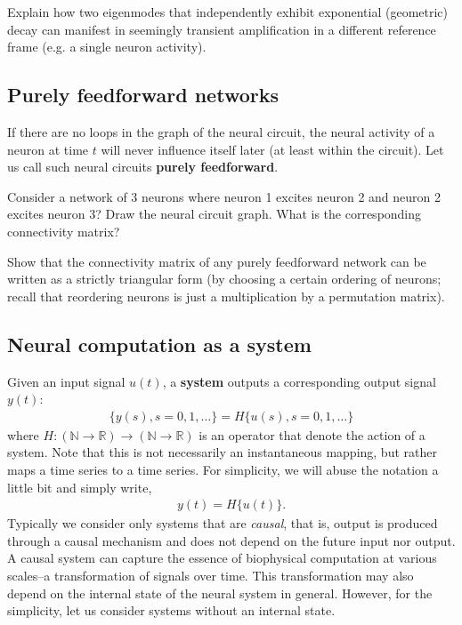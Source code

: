 \documentclass[a4paper,11pt]{exam}
\newcounter{ct}
\newcommand{\field}[1]{\ensuremath{\mathbb{#1}}}
\newcommand{\reals}{\field{R}}
\newcommand{\naturalNumbers}{\field{N}}
\begin{document}
\begin{questions}
\question Explain how two eigenmodes that independently exhibit exponential (geometric) decay can manifest in seemingly transient amplification in a different reference frame (e.g. a single neuron activity).

\subsection{Purely feedforward networks}
If there are no loops in the graph of the neural circuit, the neural activity of a neuron at time $t$ will never influence itself later (at least within the circuit).
Let us call such neural circuits \textbf{purely feedforward}.

\question Consider a network of 3 neurons where neuron 1 excites neuron 2 and neuron 2 excites neuron 3? Draw the neural circuit graph.
What is the corresponding connectivity matrix?

\question Show that the connectivity matrix of any purely feedforward network can be written as a strictly triangular form (by choosing a certain ordering of neurons; recall that reordering neurons is just a multiplication by a permutation matrix).


\subsection{Neural computation as a system}
Given an input signal $u(t)$, a \textbf{system} outputs a corresponding output signal $y(t)$:
\begin{align}
    \{y(s), s = 0, 1, \ldots\} = H\{u(s), s = 0, 1, \ldots\}
\end{align}
where $H: (\naturalNumbers \to \reals) \to (\naturalNumbers \to \reals)$ is an operator that denote the action of a system.
Note that this is not necessarily an instantaneous mapping, but rather maps a time series to a time series.
For simplicity, we will abuse the notation a little bit and simply write,
\begin{align}
    y(t) = H\{u(t)\}.
\end{align}
Typically we consider only systems that are \emph{causal}, that is, output is produced through a causal mechanism and does not depend on the future input nor output.
A causal system can capture the essence of biophysical computation at various scales--a transformation of signals over time.
This transformation may also depend on the internal state of the neural system in general.
However, for the simplicity, let us consider systems without an internal state.


\end{questions}
\end{document}
